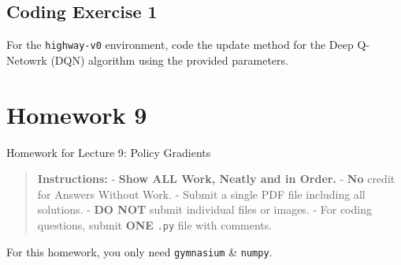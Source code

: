 \documentclass[
  letterpaper,
  DIV=11,
  numbers=noendperiod]{scrreprt}
\makeatletter
\newcommand*\pandocbounded[1]{%
  \sbox\pandoc@box{#1}%
  \Gscale@div\@tempa{\textheight}{\dimexpr\ht\pandoc@box+\dp\pandoc@box\relax}%
  \Gscale@div\@tempb{\linewidth}{\wd\pandoc@box}%
  \ifdim\@tempb\p@<\@tempa\p@\let\@tempa\@tempb\fi%
  \ifdim\@tempa\p@<\p@\scalebox{\@tempa}{\usebox\pandoc@box}%
  \else\usebox{\pandoc@box}%
  \fi%
}
\makeatother
\begin{document}
\section{Coding Exercise 1}\label{coding-exercise-1-5}

For the \texttt{highway-v0} environment, code the update method for the
Deep Q-Netowrk (DQN) algorithm using the provided parameters.

\section{\texorpdfstring{\href{https://colab.research.google.com/drive/1Y_A4uKoSmjc6EmU-Or7tbeo3fe_ZD4RH?usp=sharing}{\protect\pandocbounded{}}}{}}\label{section-6}

\chapter{Homework 9}\label{homework-9}

\begin{tcolorbox}[enhanced jigsaw, arc=.35mm, toprule=.15mm, leftrule=.75mm, colback=white, left=2mm, colframe=quarto-callout-note-color-frame, rightrule=.15mm, opacityback=0, breakable, bottomrule=.15mm]

Homework for Lecture 9: Policy Gradients 📝

\end{tcolorbox}

\begin{quote}
\textbf{Instructions:} - \textbf{Show ALL Work, Neatly and in Order.} -
\textbf{No} credit for Answers Without Work. - Submit a single PDF file
including all solutions. - \textbf{DO NOT} submit individual files or
images. - For coding questions, submit \textbf{ONE} \texttt{.py} file
with comments.
\end{quote}

\begin{tcolorbox}[enhanced jigsaw, toprule=.15mm, leftrule=.75mm, coltitle=black, left=2mm, opacityback=0, titlerule=0mm, arc=.35mm, toptitle=1mm, opacitybacktitle=0.6, bottomtitle=1mm, colframe=quarto-callout-note-color-frame, title=\textcolor{quarto-callout-note-color}{\faInfo}\hspace{0.5em}{Note}, rightrule=.15mm, bottomrule=.15mm, colbacktitle=quarto-callout-note-color!10!white, breakable, colback=white]

For this homework, you only need \texttt{gymnasium} \& \texttt{numpy}.

\end{tcolorbox}
\end{document}
